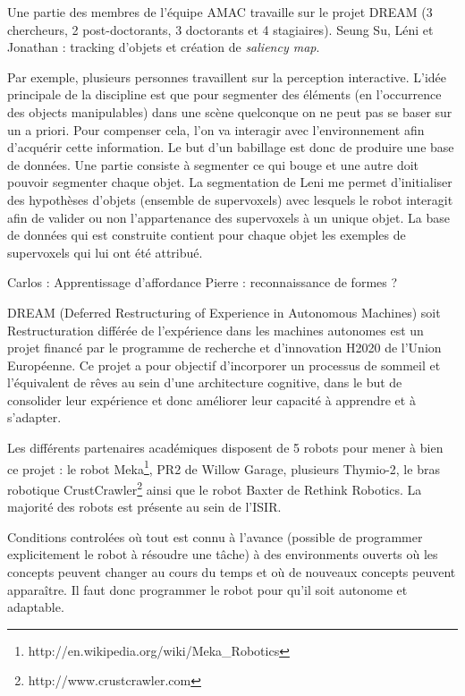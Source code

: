 \documentclass{llncs}
\begin{document}
Une partie des membres de l'équipe AMAC travaille sur le projet DREAM (3 chercheurs, 2 post-doctorants, 3 doctorants et 4 stagiaires).
Seung Su, Léni et Jonathan : tracking d'objets et création de \textit{saliency map}.

Par exemple, plusieurs personnes travaillent sur la perception interactive. L'idée principale de la discipline est que pour segmenter des éléments (en l'occurrence des objects manipulables) dans une scène quelconque on ne peut pas se baser sur un a priori. Pour compenser cela, l'on va interagir avec l'environnement afin d'acquérir cette information. Le but d'un babillage est donc de produire une base de données. Une partie consiste à segmenter ce qui bouge et une autre doit pouvoir segmenter chaque objet. La segmentation de Leni me permet d'initialiser des hypothèses d'objets (ensemble de supervoxels) avec lesquels le robot interagit afin de valider ou non l'appartenance des supervoxels à un unique objet. La base de données qui est construite contient pour chaque objet les exemples de supervoxels qui lui ont été attribué.

Carlos : Apprentissage d'affordance
Pierre : reconnaissance de formes ?

DREAM (Deferred Restructuring of Experience in Autonomous Machines) soit Restructuration différée de l'expérience dans les machines autonomes est un projet financé par le programme de recherche et d'innovation H2020 de l'Union Européenne. Ce projet a pour objectif d'incorporer un processus de sommeil et l'équivalent de rêves au sein d'une architecture cognitive, dans le but de consolider leur expérience et donc améliorer leur capacité à apprendre et à s'adapter.


Les différents partenaires académiques disposent de 5 robots pour mener à bien ce projet : le robot Meka\footnote{http://en.wikipedia.org/wiki/Meka\_Robotics}, PR2 de Willow Garage, plusieurs Thymio-2, le bras robotique CrustCrawler\footnote{http://www.crustcrawler.com} ainsi que le robot Baxter de Rethink Robotics. La majorité des robots est présente au sein de l'ISIR.

Conditions controlées où tout est connu à l'avance (possible de programmer explicitement le robot à résoudre une tâche) à des environments ouverts où les concepts peuvent changer au cours du temps et où de nouveaux concepts peuvent apparaître. Il faut donc programmer le robot pour qu'il soit autonome et adaptable.
\end{document}
